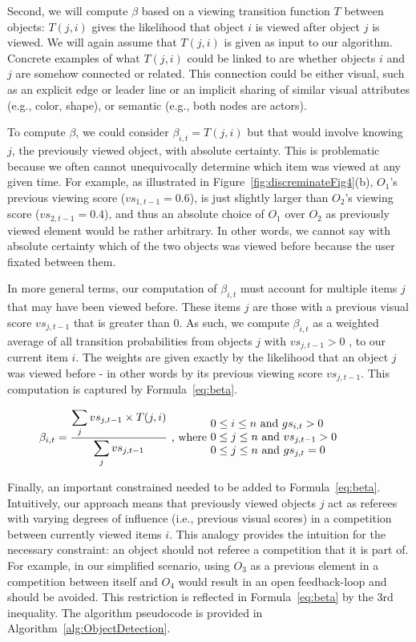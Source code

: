 Second, we will compute $\beta$ based on a viewing transition function $T$ between objects:  $T(j,i)$ gives the likelihood that object $i$ is viewed after object $j$ is viewed. We will again assume that $T(j,i)$ is given as input to our algorithm. Concrete examples of what $T(j,i)$ could be linked to are whether objects $i$ and $j$ are somehow connected or related. This connection could be either visual, such as an explicit edge or leader line or an implicit sharing of similar visual attributes (e.g., color, shape), or semantic (e.g., both nodes are actors). 

To compute $\beta$, we could consider $\beta_{i,t} = T(j,i)$ but that would involve knowing $j$, the previously viewed object, with absolute certainty. This is problematic because we often cannot unequivocally determine which item was viewed at any given time. For example, as illustrated in Figure~\ref{fig:discreminateFig4}(b), $O_1$'s previous viewing score ($vs_{1,t-1}=0.6$), is just slightly larger than $O_2$'s viewing score ($vs_{2,t-1}=0.4$), and thus an absolute choice of $O_1$ over $O_2$ as previously viewed element would be rather arbitrary.  In other words, we cannot say with absolute certainty which of the two objects was viewed before because the user fixated between them. 

In more general terms, our computation of $\beta_{i,t}$ must account for multiple items $j$ that may have been viewed before. These items $j$ are those with a previous visual score $vs_{j,t-1}$ that is greater than $0$.  As such, we compute $\beta_{i,t}$ as a weighted average of all transition probabilities from objects $j$ with $vs_{j,t-1} > 0$ , to our current item $i$. The weights are given exactly by the likelihood that an object $j$ was viewed before - in other words by its previous viewing score $vs_{j,t-1}$. This computation is captured by Formula~\ref{eq:beta}.  

\begin{equation}
\beta_{i,t} = \frac{\displaystyle\sum_{j} {vs_{j,t-1} \times T(j,i)}}{\displaystyle\sum_{j} vs_{j,t-1}} \text{ , where  } \parbox{15em}{$0\leq i \leq n$ and $gs_{i,t} > 0$\\$0\leq j \leq n$ and $vs_{j,t-1} > 0 $\\ $0\leq j \leq n$ and $gs_{j,t} = 0$ }
\label{eq:beta}
\end{equation} 

Finally, an important constrained needed to be added to Formula~\ref{eq:beta}. Intuitively, our approach means that previously viewed objects $j$ act as referees with varying degrees of influence (i.e., previous visual scores) in a competition between currently viewed items $i$. This analogy provides the intuition for the necessary constraint: an object should not referee a competition that it is part of. For example, in our simplified scenario, using $O_3$ as a previous element in a competition between itself and $O_4$ would result in an open feedback-loop and should be avoided. This restriction is reflected in Formula~\ref{eq:beta} by the 3rd inequality.  The algorithm pseudocode is provided in Algorithm~\ref{alg:ObjectDetection}.

